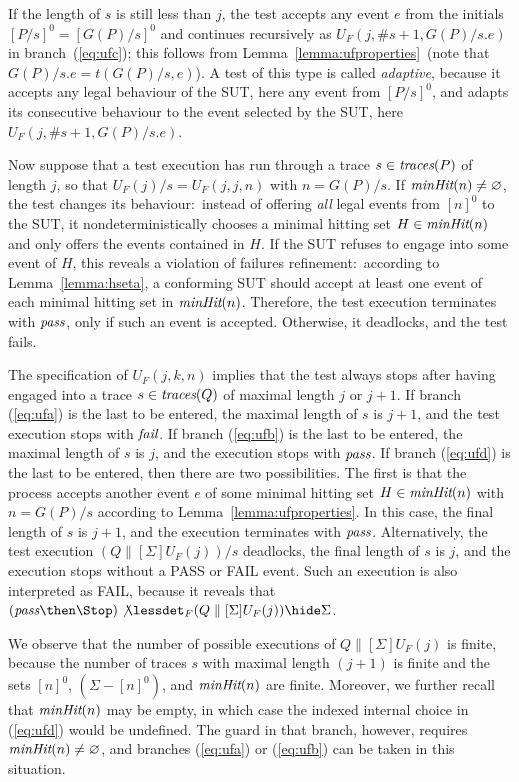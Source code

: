\documentclass[3p,times]{elsarticle}
\newcommand{\trc}{\text{\it traces}}
\newcommand{\epass}{{\text{\it pass}}}
\newcommand{\efail}{{\text{\it fail}}}
\newcommand{\minhits}{\text{\it minHit}}
\begin{document}
If the length of $s$ is still less than $j$, the test accepts any event $e$
from the initials $[P/s]^0 = [G(P)/s]^0$ and continues recursively as
$U_F(j,\#s+1,G(P)/s.e)$ in branch~(\ref{eq:ufc}); this follows from
Lemma~\ref{lemma:ufproperties}~(note that $G(P)/s.e = t(G(P)/s,e)$). A test
of this type is called \emph{adaptive}, because it accepts any legal
behaviour of the SUT, here any event from $[P/s]^0$, and adapts its
consecutive behaviour to the event selected by the SUT, here
$U_F(j,\#s+1,G(P)/s.e)$.

Now suppose that a test execution has run through a trace $s\in\trc(P)$ of
length $j$, so that $U_F(j)/s = U_F(j,j,n)$ with $n = G(P)/s$. If
$\minhits(n)\neq \varnothing$, the test changes its behaviour:~instead of
offering {\it all} legal events from $[n]^0$ to the SUT, it
nondeterministically chooses a minimal hitting set $H\in \minhits(n)$ and
only offers the events contained in $H$. If the SUT refuses to engage into
some event of $H$, this reveals a violation of failures refinement:~according
to Lemma~\ref{lemma:hseta}, a conforming SUT should accept at least one event
of each minimal hitting set in $\minhits(n)$. Therefore, the test execution
terminates with  $\epass$, only if such an event is accepted. Otherwise, it
deadlocks, and the test fails.

The specification of $U_F(j,k,n)$ implies that the test always stops after
having engaged into a trace $s\in\trc(Q)$ of maximal length $j$ or $j+1$. If
branch (\ref{eq:ufa}) is the last to be entered, the maximal length of $s$ is
$j+1$, and the test execution stops with $\efail$. If branch (\ref{eq:ufb})
is the last to be entered, the maximal length of $s$ is $j$, and the
execution stops with $\epass$. If branch (\ref{eq:ufd}) is the last to be
entered, then there are two possibilities. The first is that the process
accepts another event $e$ of some minimal hitting set $H\in\minhits(n)$ with
$n = G(P)/s$ according to Lemma~\ref{lemma:ufproperties}. In this case, the
final length of $s$ is $j+1$, and the execution terminates with $\epass$.
Alternatively, the test execution $(Q\parallel[\Sigma] U_F(j))/s$ deadlocks,
the final length of $s$ is $j$, and the execution stops without a PASS or
FAIL event. Such an execution is also interpreted as FAIL, because it reveals
that $(\epass\then\Stop) \not\lessdet_F (Q\parallel[\Sigma] U_F(j)) \hide
\Sigma$.

We observe that the number of possible executions of $Q\parallel[\Sigma]
U_F(j)$ is finite, because the number of traces $s$ with maximal length
$(j+1)$ is finite and the sets $[n]^0$, $(\Sigma - [n]^0)$, and $\minhits(n)$
are finite. Moreover, we further recall that $\minhits(n)$ may be empty, in
which case the indexed internal choice in (\ref{eq:ufd}) would be undefined.
The guard in that branch, however, requires $\minhits(n)\neq\varnothing$, and
branches (\ref{eq:ufa}) or (\ref{eq:ufb}) can be taken in this situation.
\end{document}
